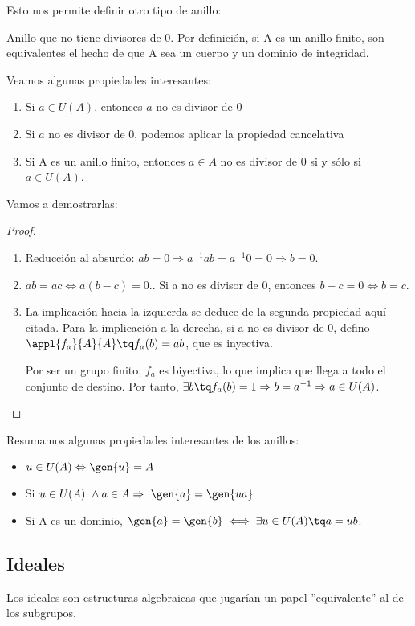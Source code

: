 \documentclass[nochap]{apuntes}
\begin{document}
Esto nos permite definir otro tipo de anillo:
\begin{defn}
 Anillo que no tiene divisores de 0. Por definición, si A es un anillo finito, son equivalentes el hecho de que A sea un cuerpo y un dominio de integridad.
\end{defn}

Veamos algunas propiedades interesantes:
\begin{enumerate}
 \item Si $a \in U(A)$, entonces $a$ no es divisor de 0
 \item Si $a$ no es divisor de 0, podemos aplicar la propiedad cancelativa
 \item Si A es un anillo finito, entonces  $a \in A$ no es divisor de 0 si y sólo si  $a \in U(A)$.
\end{enumerate}

Vamos a demostrarlas:
\begin{proof}
 \begin{enumerate}
  \item Reducción al absurdo: $ab=0 \Rightarrow a^{-1}ab=a^{-1}0=0 \Rightarrow b=0$.
  \item $ab=ac \Leftrightarrow a(b-c)=0$.. Si a no es divisor de 0, entonces $b-c=0 \Leftrightarrow b=c$.
  \item La implicación hacia la izquierda se deduce de la segunda propiedad aquí citada.
  Para la implicación a la derecha, si a no es divisor de 0, defino $\appl{f_a}{A}{A} \tq f_a(b)=ab$, que es inyectiva.

  Por ser un grupo finito, $f_a$ es biyectiva, lo que implica que llega a todo el conjunto de destino. Por tanto, $\exists b \tq f_a(b)=1 \Rightarrow b=a^{-1}  \Rightarrow a \in U(A)$.
 \end{enumerate}

\end{proof}

Resumamos algunas propiedades interesantes de los anillos:
\begin{itemize}
 \item $u\in U(A) \Leftrightarrow \gen{u} = A$
 \item Si $u \in U(A) \ \wedge a \in A \Rightarrow \ \gen{a}=\gen{ua}$
 \item Si A es un dominio, $\gen{a}=\gen{b} \iff \exists u \in U(A) \tq a=ub$.
\end{itemize}

\subsection{Ideales}
Los ideales son estructuras algebraicas que jugarían un papel ''equivalente'' al de los subgrupos.
\end{document}
